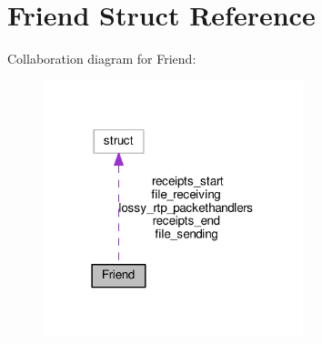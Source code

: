 \hypertarget{struct_friend}{\section{Friend Struct Reference}
\label{struct_friend}
}


Collaboration diagram for Friend\+:\nopagebreak
\begin{figure}[H]
\begin{center}
\leavevmode
\includegraphics[width=214pt]{struct_friend__coll__graph}
\end{center}
\end{figure}
